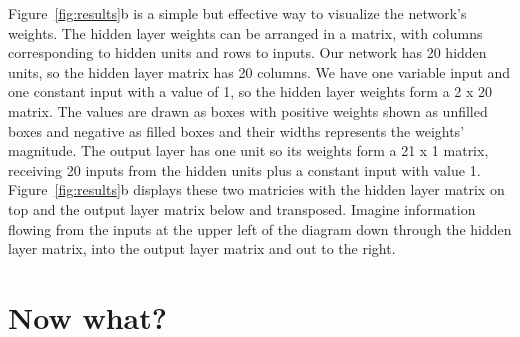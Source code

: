 Figure~\ref{fig:results}b is a simple but effective way to visualize the
network's weights.  The hidden layer weights can be arranged in a matrix, with
columns corresponding to hidden units and rows to inputs.  Our network has 20
hidden units, so the hidden layer matrix has 20 columns.  We have one variable
input and one constant input with a value of 1, so the hidden layer weights
form a 2 x 20 matrix.  The values are drawn as boxes with positive weights
shown as unfilled boxes and negative as filled boxes and their widths
represents the weights' magnitude.  The output layer has one unit so its
weights form a 21 x 1 matrix, receiving 20 inputs from the hidden units plus a
constant input with value 1.   Figure~\ref{fig:results}b displays these two
matricies with the hidden layer matrix on top and the output layer matrix
below and transposed.  Imagine information flowing from the inputs at the
upper left of the diagram down through the hidden layer matrix, into the
output layer matrix and out to the right.

\section{Now what?}

